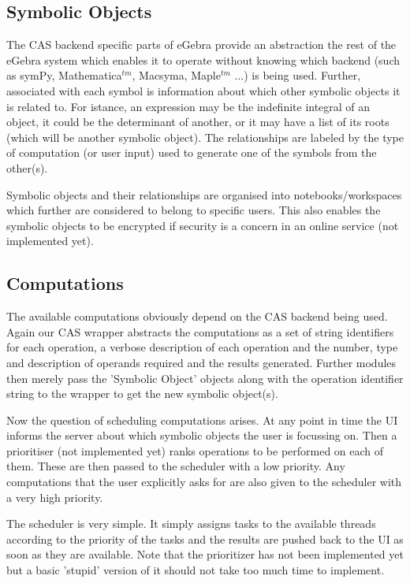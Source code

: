 \documentclass{article}
\begin{document}
\subsection{Symbolic Objects}
The CAS backend specific parts of eGebra provide an abstraction the rest of the eGebra system which enables it to operate without knowing which backend (such as symPy, Mathematica$^{tm}$, Macsyma, Maple$^{tm}$ ...) is being used. Further, associated with each symbol is information about which other symbolic objects it is related to. For istance, an expression may be the indefinite integral of an object, it could be the determinant of another, or it may have a list of its roots (which will be another symbolic object). The relationships are labeled by the type of computation (or user input) used to generate one of the symbols from the other(s).

Symbolic objects and their relationships are organised into notebooks/workspaces which further are considered to belong to specific users. This also enables the symbolic objects to be encrypted if security is a concern in an online service (not implemented yet).

\subsection{Computations}
The available computations obviously depend on the CAS backend being used. Again our CAS wrapper abstracts the computations as a set of string identifiers for each operation, a verbose description of each operation and the number, type and description of operands required and the results generated. Further modules then merely pass the 'Symbolic Object' objects along with the operation identifier string to the wrapper to get the new symbolic object(s).

Now the question of scheduling computations arises. At any point in time the UI informs the server about which symbolic objects the user is focussing on. Then a prioritiser (not implemented yet) ranks operations to be performed on each of them. These are then passed to the scheduler with a low priority. Any computations that the user explicitly asks for are also given to the scheduler with a very high priority.

The scheduler is very simple. It simply assigns tasks to the available threads according to the priority of the tasks and the results are pushed back to the UI as soon as they are available. Note that the prioritizer has not been implemented yet but a basic 'stupid' version of it should not take too much time to implement.
\end{document}

